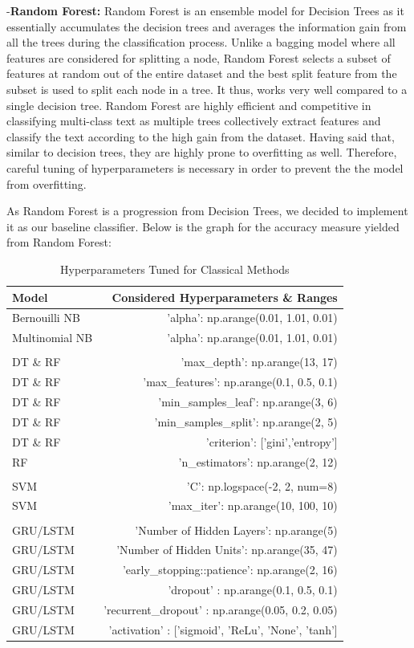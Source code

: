 \documentclass[comsoc,conference]{IEEEtran}
\begin{document}
-\textbf{Random Forest:} Random Forest is an ensemble model for Decision Trees as it essentially accumulates the decision trees and averages the information gain from all the trees during the classification process. Unlike a bagging model where all features are considered for splitting a node, Random Forest selects a subset of features at random out of the entire dataset and the best split feature from the subset is used to split each node in a tree. It thus, works very well compared to a single decision tree. Random Forest are highly efficient and competitive in classifying multi-class text as multiple trees collectively extract features and classify the text according to the high gain from the dataset. Having said that, similar to decision trees, they are highly prone to overfitting as well. Therefore, careful tuning of hyperparameters is necessary in order to prevent the the model from overfitting. 

As Random Forest is a progression from Decision Trees, we decided to implement it as our baseline classifier. Below is the graph for the accuracy measure yielded from Random Forest:




\begin{table}[h!]
\begin{tabularx}{\textwidth}{l r}
\toprule
Model & Considered Hyperparameters \& Ranges \\
\midrule
Bernouilli NB & 'alpha': np.arange(0.01, 1.01, 0.01) \\
Multinomial NB & 'alpha': np.arange(0.01, 1.01, 0.01) \\
\\
DT \& RF & 'max\_depth': np.arange(13, 17) \\
DT \& RF & 'max\_features': np.arange(0.1, 0.5, 0.1) \\
DT \& RF & 'min\_samples\_leaf': np.arange(3, 6) \\
DT \& RF & 'min\_samples\_split': np.arange(2, 5) \\
DT \& RF & 'criterion': ['gini','entropy'] \\
RF & 'n\_estimators': np.arange(2, 12) \\
\\
SVM & 'C': np.logspace(-2, 2, num=8) \\
SVM & 'max\_iter': np.arange(10, 100, 10) \\
\\
GRU/LSTM & 'Number of Hidden Layers': np.arange(5) \\
GRU/LSTM & 'Number of Hidden Units': np.arange(35, 47) \\
GRU/LSTM & 'early_stopping::patience': np.arange(2, 16) \\
GRU/LSTM & 'dropout' : np.arange(0.1, 0.5, 0.1) \\
GRU/LSTM & 'recurrent_dropout' : np.arange(0.05, 0.2, 0.05) \\
GRU/LSTM & 'activation' : ['sigmoid', 'ReLu', 'None', 'tanh'] \\
\bottomrule
\end{tabularx}
\label{my-label}
\caption{Hyperparameters Tuned for Classical Methods}
\end{table}
\end{document}
